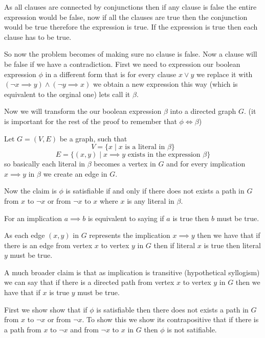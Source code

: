 \documentclass[addpoints]{exam}
\begin{document}
\begin{questions}
\begin{solution}
        As all clauses are connected by conjunctions then if any clause is false the entire expression would be false, now if all the clauses are true then the conjunction would be true therefore the expression is true. If the expression is true then each clause has to be true. 
        
        So now the problem becomes of making sure no clause is false. Now a clause will be false if we have a contradiction. First we need to expression our boolean expression $\phi$ in a different form that is for every clause $x \lor y$ we replace it with $(\neg x \implies y) \land (\neg y \implies x)$ we obtain a new expression this way (which is equivalent to the orginal one) lets call it $\beta$.
        
        Now we will transform the our boolean expression $\beta$ into a directed graph $G$. (it is important for the rest of the proof to remember that $\phi\iff\beta$)
        
        Let $G = (V, E)$ be a graph, such that
        \[V = \{x\mid x\text{ is a literal in }\beta\}\]
        \[E = \{(x,y)\mid x \implies y\text{ exists in the expression }\beta\}\]
        so basically each literal in $\beta$ becomes a vertex in $G$ and for every implication $x \implies y$ in $\beta$ we create an edge in $G$.
        
        Now the claim is $\phi$ is satisfiable if and only if there does not exists a path in $G$ from $x$ to $\neg x$ or from $\neg x$ to $x$ where $x$ is any literal in $\beta$.
        
        For an implication $a \implies b$ is equivalent to saying if $a$ is true then $b$ must be true.
        
        As each edge $(x,y)$ in $G$ represents the implication $x \implies y$ then we have that if there is an edge from vertex $x$ to vertex $y$ in $G$ then if literal $x$ is true then literal $y$ must be true. 
        
        A much broader claim is that as implication is transitive (hypothetical syllogism) we can say that if there is a directed path from vertex $x$ to vertex $y$ in $G$ then we have that if $x$ is true $y$ must be true.
        
        First we show show that if $\phi$ is satisfiable then there does not exists a path in $G$ from $x$ to $\neg x$ or from $\neg x$. To show this we show its contrapositive that if there is a path from $x$ to $\neg x$ and from $\neg x$ to $x$ in $G$ then $\phi$ is not satifiable. 
        

\end{solution}
\end{questions}
\end{document}
